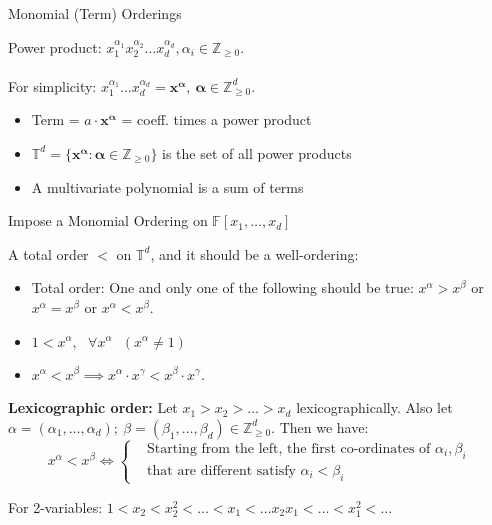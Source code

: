 \documentclass[xcolor=dvipsnames]{beamer}
\newcommand{\Z}{{\mathbb{Z}}}
\newcommand{\F}{{\mathbb{F}}}
\begin{document}
\begin{frame}{{\large Monomial (Term) Orderings}}

Power product: $x_1^{\alpha_1}x_2^{\alpha_2}\dots x_d^{\alpha_d},
\alpha_i \in \Z_{\geq 0}$. \\
\ \\
For simplicity: $x_1^{\alpha_1}\dots x_d^{\alpha_d} = \mathbf{x^{\alpha}, ~ \alpha} \in \Z^{d}_{\geq 0}$. 

\begin{itemize}
\item Term = $a\cdot \mathbf{x^{\alpha}}$ = coeff. times a power product
\item $ \mathbb{T}^d = \{ \mathbf{{x}^{\alpha}}: \mathbf{\alpha}
  \in \mathbb{Z}_{\geq 0}\}$ is the set of all power products 
\item A multivariate polynomial is a sum of terms
\end{itemize}


\end{frame}


\begin{frame}{\large Impose a Monomial Ordering on $\F[x_1, \dots, x_d]$}


A total order $<$ on $\mathbb{T}^d$, and it should be a well-ordering:
\begin{itemize}
\item Total order: One and only one of the following should be true:
  $x^{\alpha} > x^{\beta}$ or   $x^{\alpha} = x^{\beta}$ or   $x^{\alpha} < x^{\beta}$.
\item $1 < x^{\alpha}, ~~~ \forall x^{\alpha} ~~~(x^{\alpha} \neq 1)$
\item $x^{\alpha} < x^{\beta} \implies x^{\alpha}\cdot x^{\gamma} <  x^{\beta}\cdot x^{\gamma}$.
\end{itemize}

\begin{Definition}[LEX]
{\bf Lexicographic order:} Let $x_1 > x_2 > \dots > x_d$
lexicographically. Also let $\alpha = (\alpha_1, \dots, \alpha_d);
~\beta = (\beta_1, \dots, \beta_d) \in \mathbb{Z}^d_{\geq 0}$. Then we
have: 
\begin{equation*}
x^{\alpha} < x^{\beta} \iff 
\begin{cases}
& \text{Starting  from the  left, the first co-ordinates of $\alpha_i, 
  \beta_i$} \\
& \text{that are different satisfy $\alpha_i < \beta_i$}

\end{cases}
\end{equation*}

\end{Definition}

For 2-variables: $1 < x_2 < x_2^2 < \dots < x_1 < \dots x_2x_1 < \dots
< x_1^2 < \dots$
\end{frame}
\end{document}
